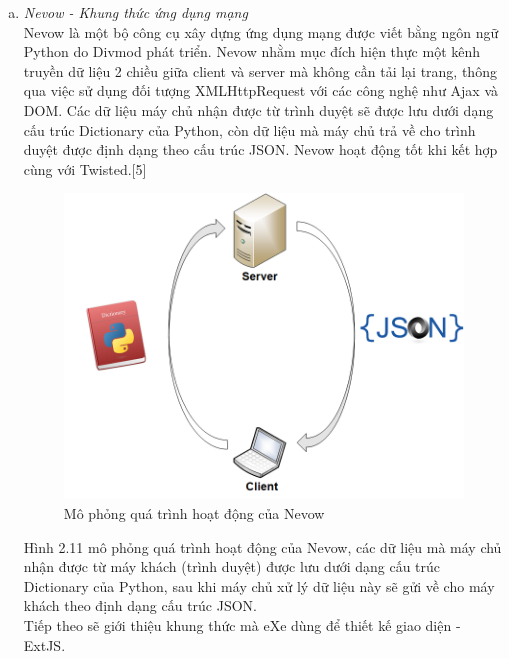\begin{enumerate}[a.]
	\item \textit{Nevow - Khung thức ứng dụng mạng}\\
	Nevow là một bộ công cụ xây dựng ứng dụng mạng được viết bằng ngôn ngữ Python do Divmod phát triển. Nevow nhằm mục đích hiện thực một kênh truyền dữ liệu 2 chiều giữa client và server mà không cần tải lại trang, thông qua việc sử dụng đối tượng XMLHttpRequest với các công nghệ như Ajax và DOM. Các dữ liệu máy chủ nhận được từ trình duyệt sẽ được lưu dưới dạng cấu trúc Dictionary của Python, còn dữ liệu mà máy chủ trả về cho trình duyệt được định dạng theo cấu trúc JSON. Nevow hoạt động tốt khi kết hợp cùng với Twisted.[5]\\
	
	\begin{center}
		\begin{figure}[htp]
			\begin{center}
				\includegraphics[width=13cm]{Chapter2/Pictures/picture211.png}
			\end{center}
			\caption{Mô phỏng quá trình hoạt động của Nevow}
			\label{refpicture211}
		\end{figure}
	\end{center}
	
	Hình 2.11 mô phỏng quá trình hoạt động của Nevow, các dữ liệu mà máy chủ nhận được từ máy khách (trình duyệt) được lưu dưới dạng cấu trúc Dictionary của Python, sau khi máy chủ xử lý dữ liệu này sẽ gửi về cho máy khách theo định dạng cấu trúc JSON.\\
	
	Tiếp theo sẽ giới thiệu khung thức mà eXe dùng để thiết kế giao diện - ExtJS.

	
\end{enumerate}

